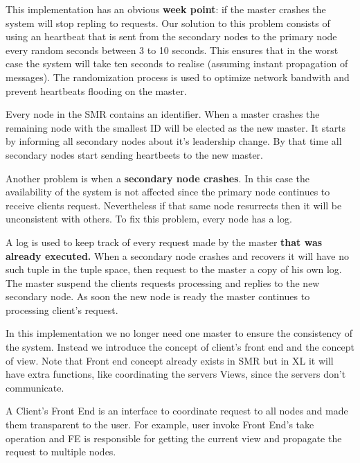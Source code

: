 \documentclass[times, 10pt,twocolumn]{article}
\begin{document}
This implementation has an obvious \textbf{week point}: if the master crashes 
the system will stop repling to requests.
Our solution to this problem consists of using an heartbeat that is sent from the
secondary nodes to the primary node every random seconds between 3 to 10 seconds.
This ensures that in the worst case the system will take ten seconds to
realise  (assuming instant propagation of messages). 
The randomization process is used to optimize network bandwith and
prevent heartbeats flooding on the master.

Every node in the SMR contains an identifier. When a master crashes the remaining
node with the smallest ID will be elected as the new master. It starts by informing
all secondary nodes about it's leadership change. By that time all secondary nodes
start sending heartbeets to the new master.

Another problem is when a \textbf{secondary node crashes}. In this case the
availability of the system is not affected since the primary node continues 
to receive clients request. Nevertheless if that same node resurrects then it
will be unconsistent with others. To fix this problem, every node has a log.

A log is used to keep track of every request made by the master 
\textbf{that was already executed.} When a secondary node crashes and recovers
it will have no such tuple in the tuple space, then request to the master
a copy of his own log. The master suspend the clients requests processing and
replies to the new secondary node. As soon the new node is ready the master
continues to processing client's request.




In this implementation we no longer need one master to ensure the consistency of the system. 
Instead we introduce the concept of client's front end and the concept of view.
Note that Front end concept already exists in SMR but in XL it will have extra functions,
like coordinating the servers Views, since the servers don't communicate.

A Client's Front End is an interface to coordinate request to all nodes and made
them transparent to the user. For example, user invoke Front End's take operation
and FE is responsible for getting the current view and propagate the request
to multiple nodes.
\end{document}
